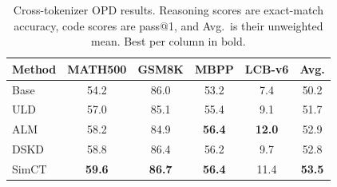 \begin{table}[t]
    \centering
    \small
    \setlength{\tabcolsep}{4pt}
    \renewcommand{\arraystretch}{1.15}
    \caption{Cross-tokenizer OPD results. Reasoning scores are exact-match accuracy, code scores are pass@1, and Avg.\ is their unweighted mean. Best per column in bold.}
    \label{tab:cross_tokenizer_results}
    \begin{tabular}{lccccc}
        \toprule
        Method
        & MATH500
        & GSM8K
        & MBPP
        & LCB-v6
        & Avg. \\

        \midrule

        Base
        & 54.2
        & 86.0
        & 53.2
        & 7.4
        & 50.2 \\

        \midrule

        ULD
        & 57.0
        & 85.1
        & 55.4
        & 9.1
        & 51.7 \\

        ALM
        & 58.2
        & 84.9
        & \textbf{56.4}
        & \textbf{12.0}
        & 52.9 \\

        DSKD
        & 58.8
        & 86.4
        & 56.2
        & 9.7
        & 52.8 \\

        SimCT
        & \textbf{59.6}
        & \textbf{86.7}
        & \textbf{56.4}
        & 11.4
        & \textbf{53.5} \\

        \bottomrule
    \end{tabular}
\end{table}